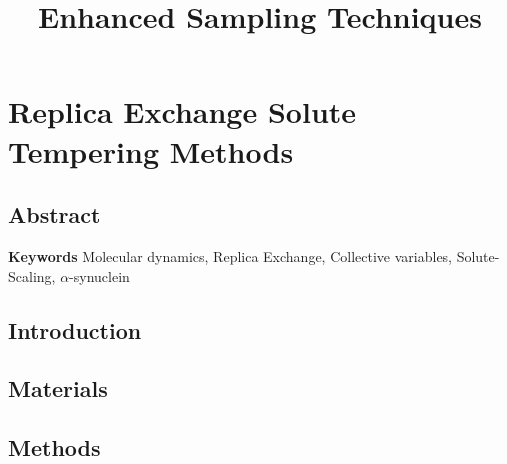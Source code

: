\documentclass{memoir}
\title{Enhanced Sampling Techniques}
\begin{document}
\date{}

\maketitle

\tableofcontents

\chapter{Replica Exchange Solute Tempering Methods}

\section{Abstract}


\textbf{Keywords} Molecular dynamics, Replica Exchange, Collective variables, Solute-Scaling, $\alpha$-synuclein

\section{Introduction}

\begin{adjustwidth}{2in}{0in}
    




\end{adjustwidth}

\section{Materials}

\section{Methods}
\begin{adjustwidth}{2in}{0in}

\begin{adjustwidth}{2in}{0in}

\end{adjustwidth}

\end{adjustwidth}


\end{document}
